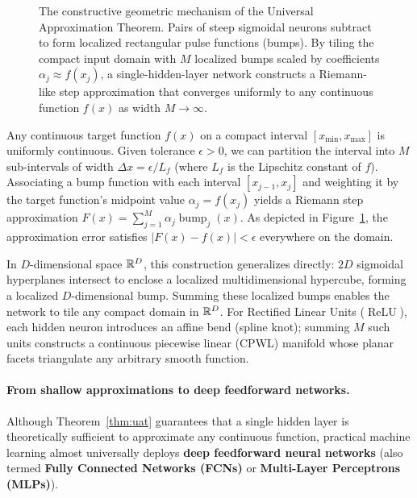 \begin{figure}[H]
\caption{The constructive geometric mechanism of the Universal Approximation Theorem. Pairs of steep sigmoidal neurons subtract to form localized rectangular pulse functions (bumps). By tiling the compact input domain with $M$ localized bumps scaled by coefficients $\alpha_j \approx f(x_j)$, a single-hidden-layer network constructs a Riemann-like step approximation that converges uniformly to any continuous function $f(x)$ as width $M \to \infty$.}
\label{fig:uat_bump_mechanism}
\end{figure}

Any continuous target function $f(x)$ on a compact interval $[x_{\min}, x_{\max}]$ is uniformly continuous. Given tolerance $\epsilon > 0$, we can partition the interval into $M$ sub-intervals of width $\Delta x = \epsilon / L_f$ (where $L_f$ is the Lipschitz constant of $f$). Associating a bump function with each interval $[x_{j-1}, x_j]$ and weighting it by the target function's midpoint value $\alpha_j = f(x_j)$ yields a Riemann step approximation $F(x) = \sum_{j=1}^M \alpha_j \operatorname{bump}_j(x)$. As depicted in Figure~\ref{fig:uat_bump_mechanism}, the approximation error satisfies $|F(x) - f(x)| < \epsilon$ everywhere on the domain.

In $D$-dimensional space $\mathbb{R}^D$, this construction generalizes directly: $2D$ sigmoidal hyperplanes intersect to enclose a localized multidimensional hypercube, forming a localized $D$-dimensional bump. Summing these localized bumps enables the network to tile any compact domain in $\mathbb{R}^D$. For Rectified Linear Units ($\operatorname{ReLU}$), each hidden neuron introduces an affine bend (spline knot); summing $M$ such units constructs a continuous piecewise linear (CPWL) manifold whose planar facets triangulate any arbitrary smooth function.

\paragraph{From shallow approximations to deep feedforward networks.}
Although Theorem~\ref{thm:uat} guarantees that a single hidden layer is theoretically sufficient to approximate any continuous function, practical machine learning almost universally deploys \textbf{deep feedforward neural networks} (also termed \textbf{Fully Connected Networks (FCNs)} or \textbf{Multi-Layer Perceptrons (MLPs)}).

